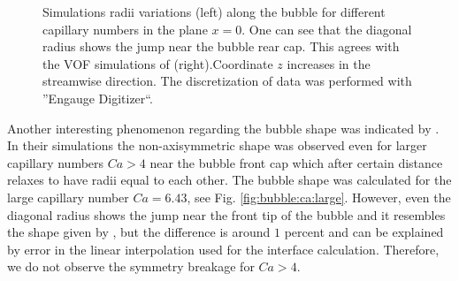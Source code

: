 \documentclass[preprint,12pt]{elsarticle}
\begin{document}
\begin{figure}[htb!]
\caption{Simulations radii variations (left)  along the bubble for different capillary numbers in
the plane $x=0$.
One can see that the diagonal radius shows the jump near the bubble rear cap. This agrees with the
VOF simulations of \citet{wang-non-circular} (right).Coordinate $z$ increases in the streamwise
direction. The discretization of \citet{wang-non-circular} data was performed with ''Engauge
Digitizer``.
\label{fig:bubble:variation:capillaries}}
\end{figure}

Another interesting phenomenon regarding the bubble shape was indicated by \citet{heil-threedim}. In
their simulations the non-axisymmetric shape was observed even for larger capillary numbers $Ca>4$
near
the bubble front cap which after certain distance relaxes to have radii equal to each other. The
bubble shape was calculated for the large capillary number $Ca=6.43$, see Fig.
\ref{fig:bubble:ca:large}. However, even the diagonal radius shows the jump near the front tip of
the bubble and it resembles the shape given by \citet{heil-threedim}, but the difference is around
$1$ percent and can be explained by error in the linear interpolation used for the
interface
calculation. Therefore, we do not observe the symmetry breakage for $Ca>4$. 
\end{document}
